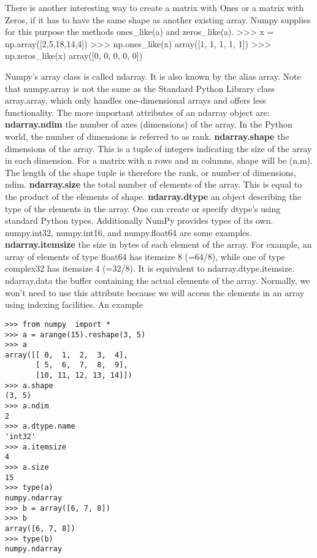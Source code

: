 There is another interesting way to create a matrix with Ones or a matrix with Zeros, if it has to have the same shape as another existing array. Numpy supplies for this purpose the methods ones_like(a) and zeros_like(a).
>>> x = np.array([2,5,18,14,4])
>>> np.ones_like(x)
array([1, 1, 1, 1, 1])
>>> np.zeros_like(x)
array([0, 0, 0, 0, 0])

\newpage


Numpy's array class is called ndarray. It is also known by the alias array. Note that numpy.array is not the same as the Standard Python Library class array.array, which only handles one-dimensional arrays and offers less functionality. The more important attributes of an ndarray object are:
\textbf{ndarray.ndim}
the number of axes (dimensions) of the array. In the Python world, the number of dimensions is referred to as rank.
\textbf{ndarray.shape}
the dimensions of the array. This is a tuple of integers indicating the size of the array in each dimension. For a matrix with n rows and m columns, shape will be (n,m). The length of the shape tuple is therefore the rank, or number of dimensions, ndim.
\textbf{ndarray.size}
the total number of elements of the array. This is equal to the product of the elements of shape.
\textbf{ndarray.dtype}
an object describing the type of the elements in the array. One can create or specify dtype's using standard Python types. Additionally NumPy provides types of its own. numpy.int32, numpy.int16, and numpy.float64 are some examples.
\textbf{ndarray.itemsize}
the size in bytes of each element of the array. For example, an array of elements of type float64 has itemsize 8 (=64/8), while one of type complex32 has itemsize 4 (=32/8). It is equivalent to ndarray.dtype.itemsize.
ndarray.data
the buffer containing the actual elements of the array. Normally, we won't need to use this attribute because we will access the elements in an array using indexing facilities.
An example
\begin{verbatim}
>>> from numpy  import *
>>> a = arange(15).reshape(3, 5)
>>> a
array([[ 0,  1,  2,  3,  4],
       [ 5,  6,  7,  8,  9],
       [10, 11, 12, 13, 14]])
>>> a.shape
(3, 5)
>>> a.ndim
2
>>> a.dtype.name
'int32'
>>> a.itemsize
4
>>> a.size
15
>>> type(a)
numpy.ndarray
>>> b = array([6, 7, 8])
>>> b
array([6, 7, 8])
>>> type(b)
numpy.ndarray
\end{verbatim}
